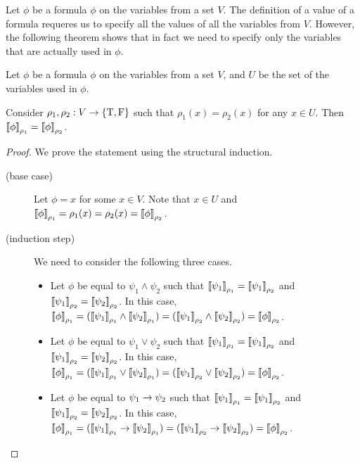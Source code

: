 Let $\phi$ be a formula $\phi$ on the variables from a set $V$. The definition
of a value of a formula requeres us to specify all the values of all the
variables from $V$. However, the following theorem shows that in
fact we need to specify only the variables that are actually used in $\phi$.
\begin{theorem}
  Let $\phi$ be a formula $\phi$ on the variables from a set $V$,
  and $U$ be the set of the variables used in $\phi$.

  Consider $\rho_1, \rho_2 : V \to \set{\ltrue, \lfalse}$ such that
  $\rho_1(x) = \rho_2(x)$ for any $x \in U$.
  Then $\left\llbracket {\phi} \right\rrbracket_{\rho_1} = \left\llbracket {\phi} \right\rrbracket_{\rho_2}$.
\end{theorem}
\begin{proof}
  We prove the statement using the structural induction.
  \begin{description}
    \item[(base case)] Let $\phi = x$ for some $x \in V$.
      Note that $x \in U$ and $\left\llbracket {\phi} \right\rrbracket_{\rho_1} = \rho_1(x) =
      \rho_2(x) = \left\llbracket {\phi} \right\rrbracket_{\rho_2}$.
    \item[(induction step)] We need to consider the following three cases.
      \begin{itemize}
        \item Let $\phi$ be equal to $\psi_1 \land \psi_2$ such that
          $\left\llbracket {\psi_1} \right\rrbracket_{\rho_1} = \left\llbracket {\psi_1} \right\rrbracket_{\rho_2}$ and
          $\left\llbracket {\psi_1} \right\rrbracket_{\rho_2} = \left\llbracket {\psi_2} \right\rrbracket_{\rho_2}$.
          In this case,
          $\left\llbracket {\phi} \right\rrbracket_{\rho_1} =
            (\left\llbracket {\psi_1} \right\rrbracket_{\rho_1} \land \left\llbracket {\psi_2} \right\rrbracket_{\rho_1} )=
            (\left\llbracket {\psi_1} \right\rrbracket_{\rho_2} \land \left\llbracket {\psi_2} \right\rrbracket_{\rho_2}) =
            \left\llbracket {\phi} \right\rrbracket_{\rho_2}$.
        \item Let $\phi$ be equal to $\psi_1 \lor \psi_2$ such that
          $\left\llbracket {\psi_1} \right\rrbracket_{\rho_1} = \left\llbracket {\psi_1} \right\rrbracket_{\rho_2}$ and
          $\left\llbracket {\psi_1} \right\rrbracket_{\rho_2} = \left\llbracket {\psi_2} \right\rrbracket_{\rho_2}$.
          In this case,
          $\left\llbracket {\phi} \right\rrbracket_{\rho_1} =
            (\left\llbracket {\psi_1} \right\rrbracket_{\rho_1} \lor \left\llbracket {\psi_2} \right\rrbracket_{\rho_1}) =
            (\left\llbracket {\psi_1} \right\rrbracket_{\rho_2} \lor \left\llbracket {\psi_2} \right\rrbracket_{\rho_2}) =
            \left\llbracket {\phi} \right\rrbracket_{\rho_2}$.
        \item Let $\phi$ be equal to $\psi_1 \rightarrow \psi_2$ such that
          $\left\llbracket {\psi_1} \right\rrbracket_{\rho_1} = \left\llbracket {\psi_1} \right\rrbracket_{\rho_2}$ and
          $\left\llbracket {\psi_1} \right\rrbracket_{\rho_2} = \left\llbracket {\psi_2} \right\rrbracket_{\rho_2}$.
          In this case,
          $\left\llbracket {\phi} \right\rrbracket_{\rho_1} =
            (\left\llbracket {\psi_1} \right\rrbracket_{\rho_1} \rightarrow \left\llbracket {\psi_2} \right\rrbracket_{\rho_1}) =
            (\left\llbracket {\psi_1} \right\rrbracket_{\rho_2} \rightarrow \left\llbracket {\psi_2} \right\rrbracket_{\rho_2}) =
            \left\llbracket {\phi} \right\rrbracket_{\rho_2}$.
      \end{itemize}
  \end{description}
\end{proof}

